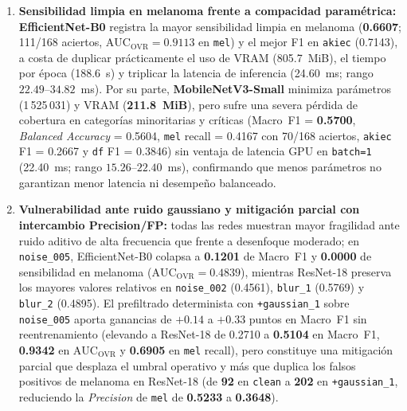 \begin{enumerate}[leftmargin=1.5em,itemsep=4pt]
\item \textbf{Sensibilidad limpia en melanoma frente a compacidad paramétrica:} \textbf{EfficientNet-B0} registra la mayor sensibilidad limpia en melanoma (\textbf{0.6607}; 111/168 aciertos, $\mathrm{AUC}_{\mathrm{OVR}}=0.9113$ en \texttt{mel}) y el mejor F1 en \texttt{akiec} (0.7143), a costa de duplicar prácticamente el uso de VRAM (805.7~MiB), el tiempo por época (188.6~s) y triplicar la latencia de inferencia (24.60~ms; rango $22.49$--$34.82$~ms). Por su parte, \textbf{MobileNetV3-Small} minimiza parámetros (1\,525\,031) y VRAM (\textbf{211.8~MiB}), pero sufre una severa pérdida de cobertura en categorías minoritarias y críticas (Macro~F1 = \textbf{0.5700}, \textit{Balanced Accuracy} = 0.5604, \texttt{mel} recall = 0.4167 con 70/168 aciertos, \texttt{akiec} F1 = 0.2667 y \texttt{df} F1 = 0.3846) sin ventaja de latencia GPU en \texttt{batch=1} (22.40~ms; rango $15.26$--$22.40$~ms), confirmando que menos parámetros no garantizan menor latencia ni desempeño balanceado.

\item \textbf{Vulnerabilidad ante ruido gaussiano y mitigación parcial con intercambio Precision/FP:} todas las redes muestran mayor fragilidad ante ruido aditivo de alta frecuencia que frente a desenfoque moderado; en \texttt{noise\_005}, EfficientNet-B0 colapsa a \textbf{0.1201} de Macro~F1 y \textbf{0.0000} de sensibilidad en melanoma ($\mathrm{AUC}_{\mathrm{OVR}}=0.4839$), mientras ResNet-18 preserva los mayores valores relativos en \texttt{noise\_002} (0.4561), \texttt{blur\_1} (0.5769) y \texttt{blur\_2} (0.4895). El prefiltrado determinista con \texttt{+gaussian\_1} sobre \texttt{noise\_005} aporta ganancias de $+0.14$ a $+0.33$ puntos en Macro~F1 sin reentrenamiento (elevando a ResNet-18 de 0.2710 a \textbf{0.5104} en Macro~F1, \textbf{0.9342} en $\mathrm{AUC}_{\mathrm{OVR}}$ y \textbf{0.6905} en \texttt{mel} recall), pero constituye una mitigación parcial que desplaza el umbral operativo y más que duplica los falsos positivos de melanoma en ResNet-18 (de \textbf{92} en \texttt{clean} a \textbf{202} en \texttt{+gaussian\_1}, reduciendo la \textit{Precision} de \texttt{mel} de \textbf{0.5233} a \textbf{0.3648}).
\end{enumerate}
